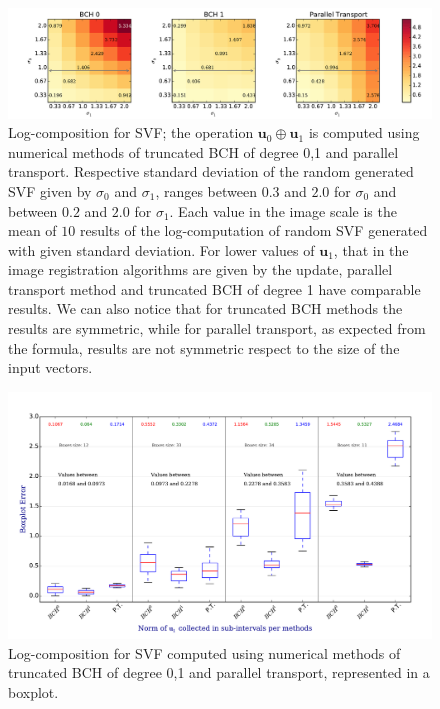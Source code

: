 \begin{figure}[!ht]
	\hspace{-2.1cm}
	\includegraphics[scale=0.55]{figures/SVF_image_scale.pdf}
	\caption{Log-composition for SVF; the operation $\mathbf{u}_0\oplus \mathbf{u}_1$ is computed using numerical methods of truncated BCH of degree 0,1 and parallel transport. Respective standard deviation of the random generated SVF given by $\sigma_0$ and $\sigma_1$, ranges between $0.3$ and $2.0$ for $\sigma_0$ and between $0.2$ and $2.0$ for $\sigma_1$. Each value in the image scale is the mean of $10$ results of the log-computation of random SVF generated with given standard deviation. For lower values of $\mathbf{u}_1$, that in the image registration algorithms are given by the update, parallel transport method and truncated BCH of degree 1 have comparable results. We can also notice that for truncated BCH methods the results are symmetric, while for parallel transport, as expected from the formula, results are not symmetric respect to the size of the input vectors. }
	\label{fig:SVF_image_scale}
\end{figure}


\begin{figure}[!ht]
	\hspace{-1.5cm}
	\includegraphics[scale=0.5]{figures/SVF_boxplot.pdf}
	\caption{Log-composition for SVF computed using numerical methods of truncated BCH of degree 0,1 and parallel transport, represented in a boxplot.}
	\label{fig:SVF_boxplot}
\end{figure}



